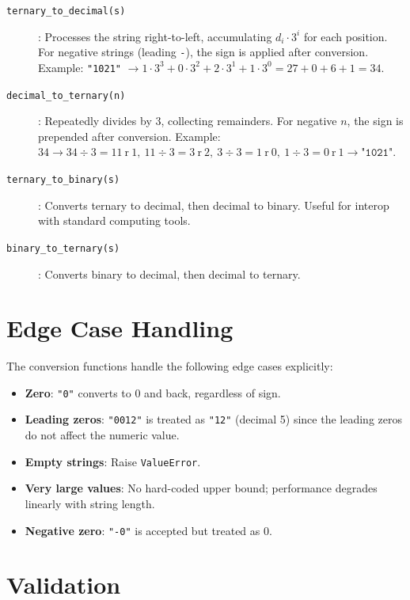 \documentclass[10pt,a4paper,twoside]{book}
\begin{document}
\begin{description}
    \item[\texttt{ternary\_to\_decimal(s)}]: Processes the string right-to-left,
          accumulating $d_i \cdot 3^i$ for each position. For negative strings (leading
          \texttt{-}), the sign is applied after conversion.
          \newline Example: \texttt{"1021"} $\rightarrow 1\cdot3^3 + 0\cdot3^2 + 2\cdot3^1 + 1\cdot3^0 = 27 + 0 + 6 + 1 = 34$.
    \item[\texttt{decimal\_to\_ternary(n)}]: Repeatedly divides by 3, collecting
          remainders. For negative $n$, the sign is prepended after conversion.
          \newline Example: $34 \rightarrow 34 \div 3 = 11\ \text{r}\ 1,\ 11 \div 3 = 3\ \text{r}\ 2,\ 3 \div 3 = 1\ \text{r}\ 0,\ 1 \div 3 = 0\ \text{r}\ 1 \rightarrow \texttt{"1021"}$.
    \item[\texttt{ternary\_to\_binary(s)}]: Converts ternary to decimal, then decimal
          to binary. Useful for interop with standard computing tools.
    \item[\texttt{binary\_to\_ternary(s)}]: Converts binary to decimal, then decimal
          to ternary.
\end{description}

\section{Edge Case Handling}

The conversion functions handle the following edge cases explicitly:
\begin{itemize}
    \item \textbf{Zero}: \texttt{"0"} converts to 0 and back, regardless of sign.
    \item \textbf{Leading zeros}: \texttt{"0012"} is treated as \texttt{"12"} (decimal 5)
          since the leading zeros do not affect the numeric value.
    \item \textbf{Empty strings}: Raise \texttt{ValueError}.
    \item \textbf{Very large values}: No hard-coded upper bound; performance degrades
          linearly with string length.
    \item \textbf{Negative zero}: \texttt{"-0"} is accepted but treated as 0.
\end{itemize}

\section{Validation}
\end{document}
